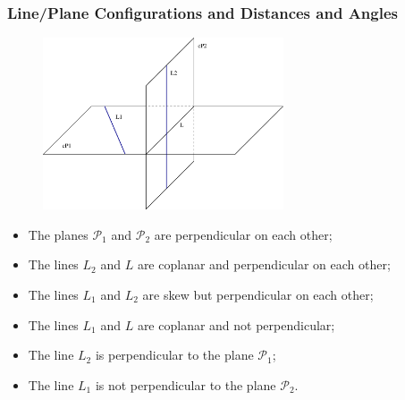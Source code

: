 \begin{frame}
\frametitle{Line/Plane Configurations and Distances and Angles}
\begin{figure}[h]
  \includegraphics[height=2in]{../../modules/coordinate-systems/pictures/perpendicularity.eps}
  \label{fig:perpendicularity}
\end{figure}
%
\begin{itemize}
%
\item The planes $\mathcal{P}_1$ and $\mathcal{P}_2$ are perpendicular on each other;
%
\item The lines $L_2$ and $L$ are coplanar and perpendicular on each other;
%
\item The lines $L_1$ and $L_2$ are skew but perpendicular on each other;
%
\item The lines $L_1$ and $L$ are coplanar and not perpendicular;
%
\item The line $L_2$ is perpendicular to the plane $\mathcal{P}_1$;
%
\item The line $L_1$ is not perpendicular to the plane $\mathcal{P}_2$.
\end{itemize}

\end{frame}